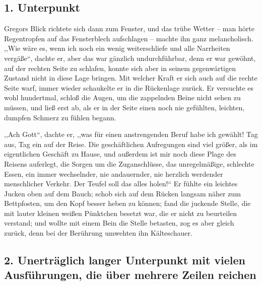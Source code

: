 \documentclass[prepress]{zchinr}
\begin{document}
\subsection{1. Unterpunkt}

Gregors Blick richtete sich dann zum Fenster, und das trübe Wetter -- man hörte Regentropfen auf das Fensterblech aufschlagen -- machte ihn ganz melancholisch. ,,Wie wäre es, wenn ich noch ein wenig weiterschliefe und alle Narrheiten vergäße``, dachte er, aber das war gänzlich undurchführbar, denn er war gewöhnt, auf der rechten Seite zu schlafen, konnte sich aber in seinem gegenwärtigen Zustand nicht in diese Lage bringen. Mit welcher Kraft er sich auch auf die rechte Seite warf, immer wieder schaukelte er in die Rückenlage zurück. Er versuchte es wohl hundertmal, schloß die Augen, um die zappelnden Beine nicht sehen zu müssen, und ließ erst ab, als er in der Seite einen noch nie gefühlten, leichten, dumpfen Schmerz zu fühlen begann.

,,Ach Gott``, dachte er, ,,was für einen anstrengenden Beruf habe ich gewählt! Tag aus, Tag ein auf der Reise. Die geschäftlichen Aufregungen sind viel größer, als im eigentlichen Geschäft zu Hause, und außerdem ist mir noch diese Plage des Reisens auferlegt, die Sorgen um die Zuganschlüsse, das unregelmäßige, schlechte Essen, ein immer wechselnder, nie andauernder, nie herzlich werdender menschlicher Verkehr. Der Teufel soll das alles holen!{}`` Er fühlte ein leichtes Jucken oben auf dem Bauch; schob sich auf dem Rücken langsam näher zum Bettpfosten, um den Kopf besser heben zu können; fand die juckende Stelle, die mit lauter kleinen weißen Pünktchen besetzt war, die er nicht zu beurteilen verstand; und wollte mit einem Bein die Stelle betasten, zog es aber gleich zurück, denn bei der Berührung umwehten ihn Kälteschauer.

\subsection{2. Unerträglich langer Unterpunkt mit vielen Ausführungen, die über mehrere Zeilen reichen}
\end{document}
